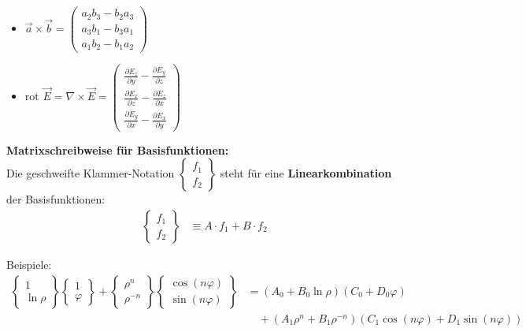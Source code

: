 \begin{itemize}
\item $\vec{a} \times \vec{b} = \begin{pmatrix}
a_2 b_3 - b_2 a_3 \\
a_3 b_1 - b_3 a_1 \\
a_1 b_2 - b_1 a_2
\end{pmatrix}$
\item $\text{rot }\vec{E} =\nabla \times \vec{E} = \begin{pmatrix}
\frac{\partial E_z}{\partial y} - \frac{\partial E_y}{\partial z} \\[0.5em]
\frac{\partial E_x}{\partial z} - \frac{\partial E_z}{\partial x} \\[0.5em]
\frac{\partial E_y}{\partial x} - \frac{\partial E_x}{\partial y}
\end{pmatrix}$
\end{itemize}

\textbf{Matrixschreibweise für Basisfunktionen:}\\
Die geschweifte Klammer-Notation $\begin{Bmatrix} f_1 \\ f_2 \end{Bmatrix}$ steht für eine \textbf{Linearkombination} der Basisfunktionen:
\begin{align}
\begin{Bmatrix} f_1 \\ f_2 \end{Bmatrix} &\equiv A \cdot f_1 + B \cdot f_2
\end{align}

Beispiele:
\begin{align}
\begin{Bmatrix} 1 \\ \ln\rho \end{Bmatrix} \begin{Bmatrix} 1 \\ \varphi \end{Bmatrix} + \begin{Bmatrix} \rho^n \\ \rho^{-n} \end{Bmatrix} \begin{Bmatrix} \cos(n\varphi) \\ \sin(n\varphi) \end{Bmatrix} &= (A_0 + B_0 \ln\rho)(C_0 + D_0 \varphi) \\
&\quad + (A_1 \rho^n + B_1 \rho^{-n})(C_1 \cos(n\varphi) + D_1 \sin(n\varphi))
\end{align}

